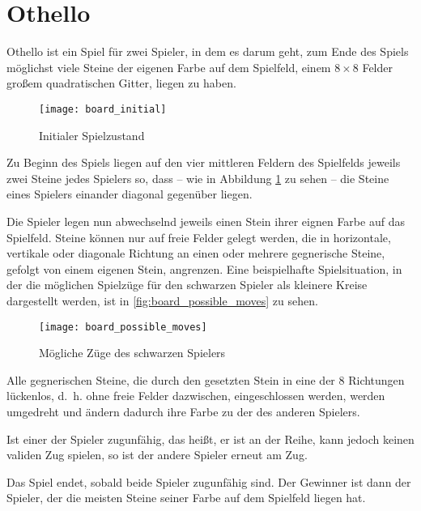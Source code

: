 \section{Othello}
\label{sec:othello}

Othello ist ein Spiel für zwei Spieler, in dem es darum geht, zum Ende des Spiels möglichst viele Steine der eigenen
Farbe auf dem Spielfeld, einem $8\times 8$ Felder großem quadratischen Gitter, liegen zu haben.

\begin{figure}[H]
    \centering
    \texttt{[image: board\_initial]}
    \caption{Initialer Spielzustand}
    \label{fig:board_initial}
\end{figure}

Zu Beginn des Spiels liegen auf den vier mittleren Feldern des Spielfelds jeweils zwei Steine jedes Spielers so, dass
– wie in Abbildung \ref{fig:board_initial} zu sehen – die Steine eines Spielers einander diagonal gegenüber liegen.

Die Spieler legen nun abwechselnd jeweils einen Stein ihrer eignen Farbe auf das Spielfeld. Steine können nur auf freie
Felder gelegt werden, die in horizontale, vertikale oder diagonale Richtung an einen oder mehrere gegnerische Steine,
gefolgt von einem eigenen Stein, angrenzen. Eine beispielhafte Spielsituation, in der die möglichen Spielzüge für den
schwarzen Spieler als kleinere Kreise dargestellt werden, ist in \autoref{fig:board_possible_moves} zu sehen. 

\begin{figure}[H]
    \centering
    \texttt{[image: board\_possible\_moves]}
    \caption{Mögliche Züge des schwarzen Spielers}
    \label{fig:board_possible_moves}
\end{figure}

Alle gegnerischen Steine, die durch den gesetzten Stein in eine der 8 Richtungen lückenlos, d. h. ohne freie Felder
dazwischen, eingeschlossen werden, werden umgedreht und ändern dadurch ihre Farbe zu der des anderen Spielers.

Ist einer der Spieler zugunfähig, das heißt, er ist an der Reihe, kann jedoch keinen validen Zug spielen, so ist der
andere Spieler erneut am Zug.

Das Spiel endet, sobald beide Spieler zugunfähig sind. Der Gewinner ist dann der Spieler, der die meisten Steine seiner
Farbe auf dem Spielfeld liegen hat.
\cite{worldothellorules}
